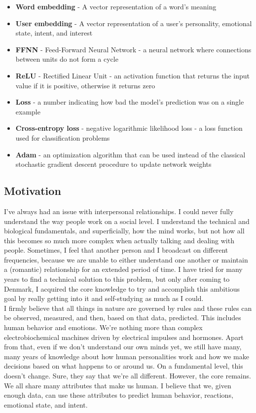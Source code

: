 \documentclass{article}
\begin{document}
\begin{itemize}
	\item \textbf{Word embedding} - A vector representation of a word's meaning
	\item \textbf{User embedding} - A vector representation of a user's personality, emotional state, intent, and interest
	\item \textbf{FFNN} - Feed-Forward Neural Network - a neural network where connections between units do not form a cycle
	\item \textbf{ReLU} - Rectified Linear Unit - an activation function that returns the input value if it is positive, otherwise it returns zero
	\item \textbf{Loss} - a number indicating how bad the model's prediction was on a single example
	\item \textbf{Cross-entropy loss} - negative logarithmic likelihood loss - a loss function used for classification problems
	\item \textbf{Adam} - an optimization algorithm that can be used instead of the classical stochastic gradient descent procedure to update network weights
\end{itemize}
\subsection{Motivation}
I've always had an issue with interpersonal relationships. I could never fully understand the way people work on a social level. I understand the technical and biological fundamentals, and superficially, how the mind works, but not how all this becomes so much more complex when actually talking and dealing with people. Sometimes, I feel that another person and I broadcast on different frequencies, because we are unable to either understand one another or maintain a (romantic) relationship for an extended period of time. I have tried for many years to find a technical solution to this problem, but only after coming to Denmark, I acquired the core knowledge to try and accomplish this ambitious goal by really getting into it and self-studying as much as I could.\\
I firmly believe that all things in nature are governed by rules and these rules can be observed, measured, and then, based on that data, predicted. This includes human behavior and emotions. We’re nothing more than complex electrobiochemical machines driven by electrical impulses and hormones. Apart from that, even if we don’t understand our own minds yet, we still have many, many years of knowledge about how human personalities work and how we make decisions based on what happens to or around us. On a fundamental level, this doesn’t change. Sure, they say that we’re all different. However, the core remains. We all share many attributes that make us human. I believe that we, given enough data, can use these attributes to predict human behavior, reactions, emotional state, and intent.
\end{document}
